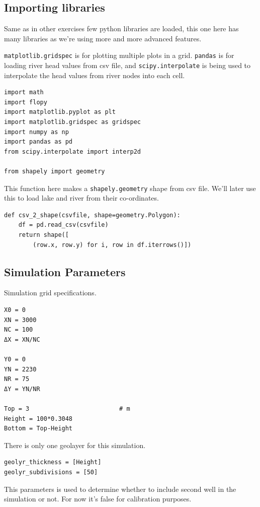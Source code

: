 \documentclass[titlepage,12pt]{unisubmission}
\begin{document}
\subsection{Importing libraries}
\label{sec:orge22cb5e}
Same as in other exercises few python libraries are loaded, this one here has many libraries as we're using more and more advanced features.

\texttt{matplotlib.gridspec} is for plotting multiple plots in a grid. \texttt{pandas} is for loading river head values from csv file, and \texttt{scipy.interpolate} is being used to interpolate the head values from river nodes into each cell.

\begin{verbatim}
import math
import flopy
import matplotlib.pyplot as plt
import matplotlib.gridspec as gridspec
import numpy as np
import pandas as pd
from scipy.interpolate import interp2d

from shapely import geometry
\end{verbatim}


This function here makes a \texttt{shapely.geometry} shape from csv file. We'll later use this to load lake and river from their co-ordinates.

\begin{verbatim}
def csv_2_shape(csvfile, shape=geometry.Polygon):
    df = pd.read_csv(csvfile)
    return shape([
        (row.x, row.y) for i, row in df.iterrows()])
\end{verbatim}

\subsection{Simulation Parameters}
\label{sec:org471fe4a}
Simulation grid specifications.

\begin{verbatim}
X0 = 0
XN = 3000
NC = 100
ΔX = XN/NC

Y0 = 0
YN = 2230
NR = 75
ΔY = YN/NR

Top = 3                         # m
Height = 100*0.3048
Bottom = Top-Height
\end{verbatim}

There is only one geolayer for this simulation.

\begin{verbatim}
geolyr_thickness = [Height]
geolyr_subdivisions = [50]
\end{verbatim}

This parameters is used to determine whether to include second well in the simulation or not. For now it's false for calibration purposes.
\end{document}
